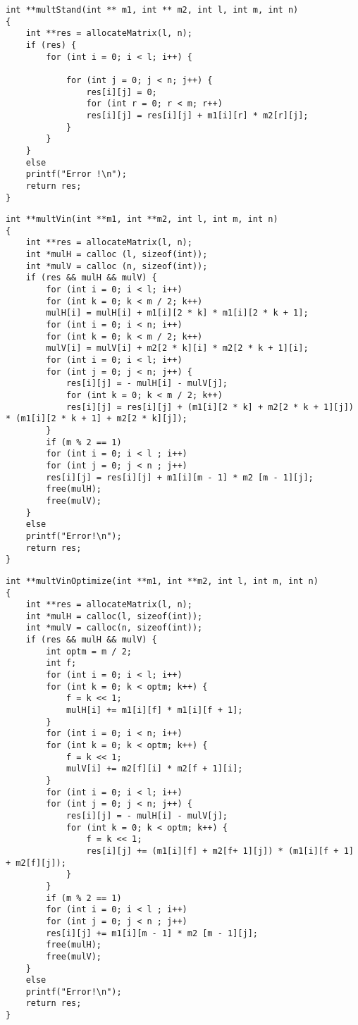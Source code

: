 \begin{lstlisting}[label=lst:stand,caption=Реализация стандартного алгоритма умножения матриц]
int **multStand(int ** m1, int ** m2, int l, int m, int n)
{
	int **res = allocateMatrix(l, n);
	if (res) {
		for (int i = 0; i < l; i++) {
			
			for (int j = 0; j < n; j++) {
				res[i][j] = 0;
				for (int r = 0; r < m; r++)
				res[i][j] = res[i][j] + m1[i][r] * m2[r][j];
			}
		}
	}
	else
	printf("Error !\n");
	return res;
}
\end{lstlisting}

\begin{lstlisting}[label=lst:vin,caption=Реализация алгоритма умножения матриц Винограда]
int **multVin(int **m1, int **m2, int l, int m, int n)
{
	int **res = allocateMatrix(l, n);
	int *mulH = calloc (l, sizeof(int));
	int *mulV = calloc (n, sizeof(int));
	if (res && mulH && mulV) {
		for (int i = 0; i < l; i++)
		for (int k = 0; k < m / 2; k++)
		mulH[i] = mulH[i] + m1[i][2 * k] * m1[i][2 * k + 1];
		for (int i = 0; i < n; i++)
		for (int k = 0; k < m / 2; k++)
		mulV[i] = mulV[i] + m2[2 * k][i] * m2[2 * k + 1][i];
		for (int i = 0; i < l; i++)
		for (int j = 0; j < n; j++) {
			res[i][j] = - mulH[i] - mulV[j];
			for (int k = 0; k < m / 2; k++)
			res[i][j] = res[i][j] + (m1[i][2 * k] + m2[2 * k + 1][j]) * (m1[i][2 * k + 1] + m2[2 * k][j]);
		}
		if (m % 2 == 1)
		for (int i = 0; i < l ; i++)
		for (int j = 0; j < n ; j++)
		res[i][j] = res[i][j] + m1[i][m - 1] * m2 [m - 1][j];
		free(mulH);
		free(mulV);
	}
	else
	printf("Error!\n");
	return res;
}
\end{lstlisting}

\begin{lstlisting}[label=lst:vinopt,caption=Реализация оптимизированного алгоритма умножения матриц Винограда ]
int **multVinOptimize(int **m1, int **m2, int l, int m, int n)
{
	int **res = allocateMatrix(l, n);
	int *mulH = calloc(l, sizeof(int));
	int *mulV = calloc(n, sizeof(int));
	if (res && mulH && mulV) {
		int optm = m / 2;
		int f;
		for (int i = 0; i < l; i++)
		for (int k = 0; k < optm; k++) {
			f = k << 1;
			mulH[i] += m1[i][f] * m1[i][f + 1];
		}
		for (int i = 0; i < n; i++)
		for (int k = 0; k < optm; k++) {
			f = k << 1;
			mulV[i] += m2[f][i] * m2[f + 1][i];
		}
		for (int i = 0; i < l; i++)
		for (int j = 0; j < n; j++) {
			res[i][j] = - mulH[i] - mulV[j];
			for (int k = 0; k < optm; k++) {
				f = k << 1;
				res[i][j] += (m1[i][f] + m2[f+ 1][j]) * (m1[i][f + 1] + m2[f][j]);
			}
		}
		if (m % 2 == 1)
		for (int i = 0; i < l ; i++)
		for (int j = 0; j < n ; j++)
		res[i][j] += m1[i][m - 1] * m2 [m - 1][j];
		free(mulH);
		free(mulV);
	}
	else
	printf("Error!\n");
	return res;
}
\end{lstlisting}

